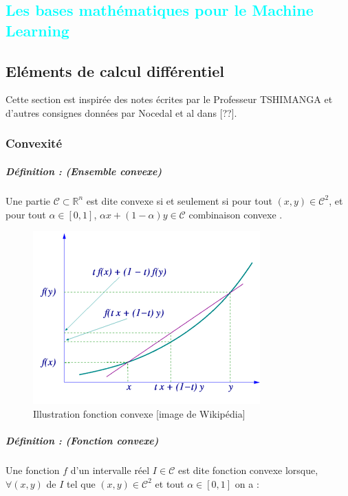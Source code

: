
%
%
 
\textcolor{cyan}{\chapter{Les bases mathématiques pour le Machine Learning}}
	\section{Eléments de calcul différentiel}
	Cette section est inspirée des notes écrites par le Professeur TSHIMANGA \cite[voir][page:45-82]{jtshiman:2021} et d'autres consignes données par Nocedal et al dans \cite{bottou2018optimization} \cite{coulombeau2013math}[??].
	\subsection{Convexité}
		\paragraph*{Définition : (Ensemble convexe)} 
		Une partie $\mathcal{C} \subset \mathbb{R}^n $ est dite convexe si et seulement si pour tout $(x,y) \in \mathcal{C}^2$, 
		et pour tout $ \alpha \in [0, 1]$,
		$ \alpha x + (1 - \alpha)y \in \mathcal{C}$ combinaison convexe \cite{jtshiman:2021}.
		\begin{figure}[bth]
			\centering
			\includegraphics{images/convex_function_graph.png}
			\caption{Illustration fonction convexe [image de Wikipédia]}
			\label{fig:convexe_graph}
		\end{figure}
	
	
	
		
		\paragraph*{Définition : (Fonction convexe)}
		Une fonction $f$ d'un intervalle réel $I \in \mathcal{C}$ est dite fonction convexe lorsque, $\forall (x,y)$ de $I$ tel que $(x,y) \in \mathcal{C}^2$ et tout $\alpha \in [0, 1]$  on a :
		
